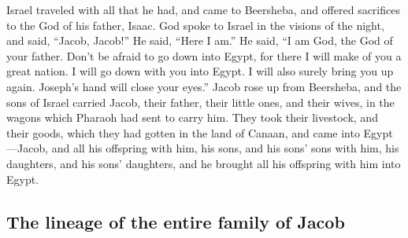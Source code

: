  Israel traveled with all that he had, and came to
Beersheba, and offered sacrifices to the God of his father, Isaac.
 God spoke to Israel in the visions of the night, and
said, ``Jacob, Jacob!'' He said, ``Here I am.''  He said,
``I am God, the God of your father. Don't be afraid to go down into
Egypt, for there I will make of you a great nation.  I
will go down with you into Egypt. I will also surely bring you up again.
Joseph's hand will close your eyes.''  Jacob rose up from
Beersheba, and the sons of Israel carried Jacob, their father, their
little ones, and their wives, in the wagons which Pharaoh had sent to
carry him.  They took their livestock, and their goods,
which they had gotten in the land of Canaan, and came into
Egypt---Jacob, and all his offspring with him,  his sons,
and his sons' sons with him, his daughters, and his sons' daughters, and
he brought all his offspring with him into Egypt.

\hypertarget{the-lineage-of-the-entire-family-of-jacob}{%
\subsection{The lineage of the entire family of
Jacob}\label{the-lineage-of-the-entire-family-of-jacob}}

